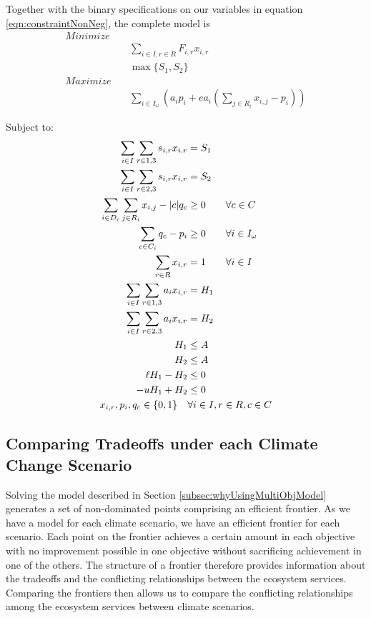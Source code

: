 Together with the binary specifications on our variables in equation \eqref{eqn:constraintNonNeg}, the complete model is
\begin{align*}
Minimize \quad & \\
&\sum_{i\in I,r\in R} F_{i,r} x_{i,r}\\
&\max \{S_1,S_2\}\\
Maximize \quad & \\
&\sum_{i\in I_\omega} \left(a_i p_i + e a_i \left( \sum_{j \in R_i} x_{i,j}-p_i \right) \right)
\end{align*}

Subject to:
\begin{align}
\sum_{i\in I} \sum_{r\in 1,3} s_{i,r} x_{i,r} &= S_1 \notag\\
\sum_{i\in I} \sum_{r\in 2,3} s_{i,r} x_{i,r} &= S_2 \notag\\
\sum_{i \in D_c} \sum_{j \in R_i}x_{i,j} - |c| q_c &\ge 0 \qquad \forall c \in C \notag\\
\sum_{c \in C_i} q_c - p_i &\ge 0 \qquad \forall i \in I_\omega \notag\\
\sum_{r \in R} x_{i,r} &= 1  \qquad \forall i \in I \notag\\
\sum_{i \in I} \sum_{r \in 1,3} a_i x_{i,r} &= H_1 \notag\\
\sum_{i \in I} \sum_{r \in 2,3} a_i x_{i,r} &= H_2 \notag\\
H_1 &\le A \notag\\
H_2 &\le A \notag\\
\ell H_1 - H_2 &\le 0 \notag\\
-u H_1 + H_2 &\le 0 \notag\\
x_{i,r}, p_i, q_c \in \{0,1\} \quad &\forall i \in I, r \in R, c \in C \label{eqn:constraintNonNeg}
\end{align}


\subsection{Comparing Tradeoffs under each Climate Change Scenario}
Solving the model described in Section \ref{subsec:whyUsingMultiObjModel} generates a set of non-dominated points comprising an efficient frontier. As we have a model for each climate scenario, we have an efficient frontier for each scenario. Each point on the frontier achieves a certain amount in each objective with no improvement possible in one objective without sacrificing achievement in one of the others. The structure of a frontier therefore provides information about the tradeoffs and the conflicting relationships between the ecosystem services. Comparing the frontiers then allows us to compare the conflicting relationships among the ecosystem services between climate scenarios.

